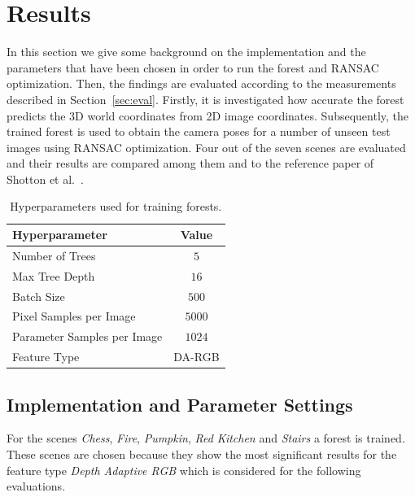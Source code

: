 \documentclass[final]{cvpr}
\begin{document}

\section{Results}
In this section we give some background on the implementation and the parameters that have been chosen in order to 
run the forest and RANSAC optimization. Then, the findings are evaluated according to the measurements described
in Section~\ref{sec:eval}. Firstly, it is investigated how accurate the 
forest predicts the 3D world coordinates from 2D image coordinates. Subsequently, the trained forest is used to obtain 
the camera poses for a number of unseen test images using RANSAC optimization. Four out of the seven scenes 
are evaluated and their results are compared among them and to the reference paper of Shotton et al.~\cite{shotton2013}. 

\begin{table}[h!]
	\begin{center}
	\begin{tabular}{|l|c|}
	\hline
	Hyperparameter & Value \\
	\hline\hline
	Number of Trees & $5$ \\
	Max Tree Depth & $16$ \\
	Batch Size & $500$ \\
	Pixel Samples per Image & $5000$ \\
	Parameter Samples per Image  & $1024$ \\
	Feature Type & DA-RGB \\
	\hline
	\end{tabular}
	\end{center}
	\caption{Hyperparameters used for training forests.}
	\label{tab:params-forest}
\end{table}

\subsection{Implementation and Parameter Settings}
For the scenes \textit{Chess}, \textit{Fire},  \textit{Pumpkin},  \textit{Red Kitchen} and  \textit{Stairs} a forest is
trained. These scenes are chosen because they show the most significant results for the feature type \textit{Depth Adaptive RGB} 
which is considered for the following evaluations.
\end{document}
